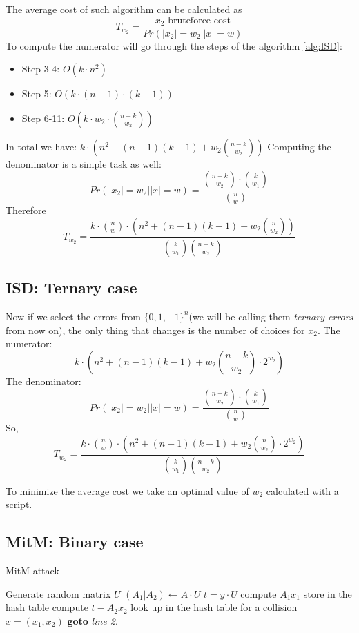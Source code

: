 \documentclass[12pt]{article}
\begin{document}
The average cost of such algorithm can be calculated as
\[
T_{w_{2}} = \frac{x_2\text{ bruteforce cost}}{Pr(|x_2| = w_2||x| = w)}
\]
To compute the numerator will go through the steps of the algorithm \ref{alg:ISD}:
\begin{itemize}
    \item Step 3-4: $O(k\cdot n^2)$
    \item Step 5: $O(k \cdot (n-1) \cdot (k-1))$
    \item Step 6-11: $O(k \cdot w_2 \cdot \binom{n-k}{w_2})$
\end{itemize}
In total we have: $k \cdot (n^2 + (n-1)(k-1) + w_2\binom{n-k}{w_2})$
Computing the denominator is a simple task as well:
\[
    Pr(|x_2| = w_2||x| = w) = \frac{\binom{n-k}{w_2} \cdot \binom{k}{w_1}}{\binom{n}{w}}
\]
Therefore
\[
T_{w_{2}} = \frac{k\cdot\binom{n}{w}\cdot(n^2 + (n-1)(k-1) + w_2\binom{n}{w_2})}{\binom{k}{w_1}\binom{n-k}{w_2}}
\]
\subsection{ISD: Ternary case}
Now if we select the errors from $\{0,1,-1\}^{n}$(we will be calling them \textit{ternary errors} from now on), the only thing that changes is the number of choices for $x_2$.
The numerator:
\[
    k\cdot(n^2 + (n-1)(k-1) + w_2\binom{n-k}{w_2}\cdot2^{w_2})
\]
The denominator:
\[
    Pr(|x_2| = w_2||x| = w) = \frac{\binom{n-k}{w_2} \cdot \binom{k}{w_1}}{\binom{n}{w}}
\]
So,
\[
T_{w_{2}} = \frac{k\cdot\binom{n}{w}\cdot(n^2 + (n-1)(k-1) + w_2\binom{n}{w_2}\cdot2^{w_2})}{\binom{k}{w_1}\binom{n-k}{w_2}}
\]

To minimize the average cost we take an optimal value of $w_2$ calculated with a script.

\subsection{MitM: Binary case}

\begin{algorithm}
\caption{MitM attack}\label{alg:MitM}
\begin{algorithmic}[1]
    \State Generate random matrix $U$
    \State $(A_1|A_2) \gets A \cdot U$
    \State $t = y \cdot U$
    \State compute $A_1x_1$
    \State store in the hash table
    \EndFor
    \State compute $t - A_2x_2$
    \State look up in the hash table for a collision
        \State \Return $x = (x_1, x_2)$
    \EndIf
    \EndFor
\State \textbf{goto} \emph{line 2}.
\EndProcedure
\end{algorithmic}
\end{algorithm}
\end{document}
